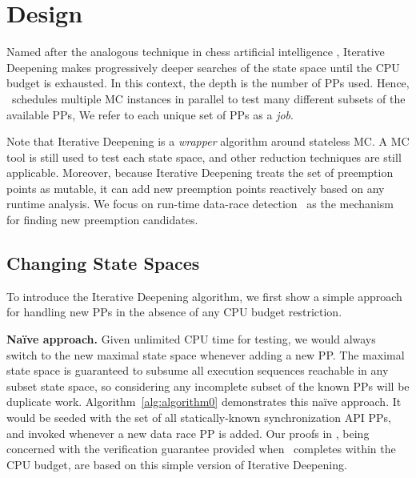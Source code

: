 \section{Design}
\label{sec:design}

Named after the analogous technique in chess artificial intelligence \cite{iterative-deepening-chess-ai},
Iterative Deepening
makes progressively deeper searches of the state space until the CPU budget is exhausted.
In this context, the depth is the number of PPs used.
Hence,
\quicksand~schedules multiple MC instances in parallel to
test many different subsets of the available PPs,
We refer to each unique set of PPs as a {\em job}.

Note that Iterative Deepening is a {\em wrapper} algorithm around stateless MC.
A MC tool is still used to test each state space, and other reduction techniques are still applicable.
Moreover, because Iterative Deepening treats the set of preemption points as mutable,
it can add new preemption points reactively based on any runtime analysis.
We focus on run-time data-race detection~\cite{hybriddatarace,tsan,ifrit} as the mechanism for finding new preemption candidates.


\cbstart
\subsection{Changing State Spaces}
\label{sec:algorithm0}

To introduce the Iterative Deepening algorithm,
we first show a simple approach for handling new PPs in the absence of any CPU budget restriction.

{\bf Na\"ive approach.}
Given unlimited CPU time for testing,
we would always switch to the new maximal state space whenever adding a new PP.
The maximal state space is guaranteed to subsume all execution sequences reachable in any subset state space,
so considering any incomplete subset of the known PPs will be duplicate work.
Algorithm~\ref{alg:algorithm0} demonstrates this na\"ive approach.
It would be seeded with the set of all statically-known synchronization API PPs,
and invoked whenever a new data race PP is added.
%
Our proofs in \sect{\ref{sec:totalverif}},
being concerned with the verification guarantee provided when \quicksand~completes within the CPU budget,
are based on this simple version of Iterative Deepening.
%

